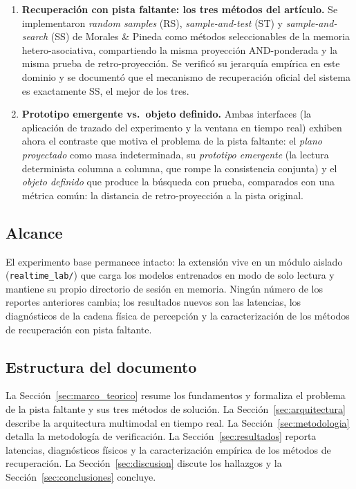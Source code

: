 \begin{enumerate}
    \item \textbf{Recuperación con pista faltante: los tres métodos del artículo.}
    Se implementaron \emph{random samples} (RS), \emph{sample-and-test} (ST) y
    \emph{sample-and-search} (SS) de Morales \& Pineda \cite{morales2025missing} como
    métodos seleccionables de la memoria hetero-asociativa, compartiendo la misma
    proyección AND-ponderada y la misma prueba de retro-proyección.
    Se verificó su jerarquía empírica en este dominio y se documentó que el
    mecanismo de recuperación oficial del sistema es exactamente SS, el mejor de los
    tres.

    \item \textbf{Prototipo emergente vs.\ objeto definido.}
    Ambas interfaces (la aplicación de trazado del experimento y la ventana en tiempo
    real) exhiben ahora el contraste que motiva el problema de la pista faltante: el
    \emph{plano proyectado} como masa indeterminada, su \emph{prototipo emergente}
    (la lectura determinista columna a columna, que rompe la consistencia conjunta) y
    el \emph{objeto definido} que produce la búsqueda con prueba, comparados con una
    métrica común: la distancia de retro-proyección a la pista original.
\end{enumerate}

\subsection*{Alcance}

El experimento base permanece intacto: la extensión vive en un módulo aislado
(\texttt{realtime\_lab/}) que carga los modelos entrenados en modo de solo lectura y
mantiene su propio directorio de sesión en memoria.
Ningún número de los reportes anteriores cambia; los resultados nuevos son las
latencias, los diagnósticos de la cadena física de percepción y la caracterización de
los métodos de recuperación con pista faltante.

\subsection*{Estructura del documento}

La Sección~\ref{sec:marco_teorico} resume los fundamentos y formaliza el problema de
la pista faltante y sus tres métodos de solución.
La Sección~\ref{sec:arquitectura} describe la arquitectura multimodal en tiempo real.
La Sección~\ref{sec:metodologia} detalla la metodología de verificación.
La Sección~\ref{sec:resultados} reporta latencias, diagnósticos físicos y la
caracterización empírica de los métodos de recuperación.
La Sección~\ref{sec:discusion} discute los hallazgos y la
Sección~\ref{sec:conclusiones} concluye.
